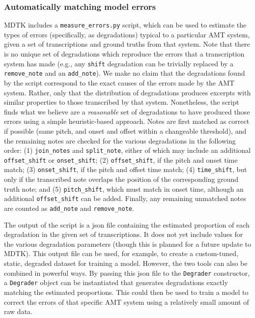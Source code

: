 \documentclass{article}
\begin{document}
\subsubsection{Automatically matching model errors}
MDTK includes a \texttt{\mbox{measure_errors.py}} script, which can be used to estimate the types of errors (specifically, as degradations) typical to a particular AMT system, given a set of transcriptions and ground truths from that system. Note that there is no unique set of degradations which reproduce the errors that a transcription system has made (e.g., any \texttt{shift} degradation can be trivially replaced by a \texttt{\mbox{remove_note}} and an \texttt{\mbox{add_note}}). We make no claim that the degradations found by the script correspond to the exact causes of the errors made by the AMT system. Rather, only that the distribution of degradations produces excerpts with similar properties to those transcribed by that system. Nonetheless, the script finds what we believe are a \textit{reasonable} set of degradations to have produced those errors using a simple heuristic-based approach. Notes are first matched as correct if possible (same pitch, and onset and offset within a changeable threshold), and the remaining notes are checked for the various degradations in the following order: (1) \texttt{\mbox{join_notes}} and \texttt{\mbox{split_note}}, either of which may include an additional \texttt{\mbox{offset_shift}} or \texttt{\mbox{onset_shift}}; (2) \texttt{\mbox{offset_shift}}, if the pitch and onset time match; (3) \texttt{\mbox{onset_shift}}, if the pitch and offset time match; (4) \texttt{\mbox{time_shift}}, but only if the transcribed note overlaps the position of the corresponding ground truth note; and (5) \texttt{\mbox{pitch_shift}}, which must match in onset time, although an additional \texttt{\mbox{offset_shift}} can be added. Finally, any remaining unmatched notes are counted as \texttt{\mbox{add_note}} and \texttt{\mbox{remove_note}}.

The output of the script is a json file containing the estimated proportion of each degradation in the given set of transcriptions. It does not yet include values for the various degradation parameters (though this is planned for a future update to MDTK). This output file can be used, for example, to create a custom-tuned, static, degraded dataset for training a model. However, the two tools can also be combined in powerful ways. By passing this json file to the \texttt{\mbox{Degrader}} constructor, a \texttt{\mbox{Degrader}} object can be instantiated that generates degradations exactly matching the estimated proportions. This could then be used to train a model to correct the errors of that specific AMT system using a relatively small amount of raw data.
\end{document}
